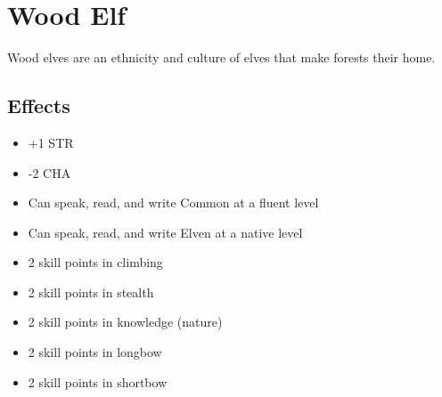 \section{Wood Elf}\label{culture:wood-elf}
Wood elves are an ethnicity and culture of elves that make forests their
home.

\subsection{Effects}
\begin{itemize}
    \item +1 STR
    \item -2 CHA
    \item Can speak, read, and write Common at a fluent level
    \item Can speak, read, and write Elven at a native level
    \item 2 skill points in climbing
    \item 2 skill points in stealth
    \item 2 skill points in knowledge (nature)
    \item 2 skill points in longbow
    \item 2 skill points in shortbow
\end{itemize}
